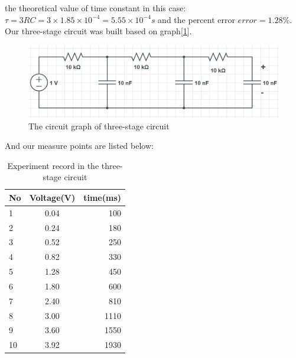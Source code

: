 the theoretical value of time constant in this case:\\
$\tau = 3RC = 3\times1.85\times10^{-4} = 5.55\times10^{-4}s$ and the percent error $error = 1.28\%$.\\
\phantom{ } Our three-stage circuit was built based on graph[\ref{fig:2.4}].\\
\begin{figure}[!htbp]
	\centering %
	\includegraphics[width=\linewidth]{images/2_4.PNG} %
	\caption{The circuit graph of three-stage circuit} %
	\label{fig:2.4} %
\end{figure}
\phantom{ }And our measure points are listed below:\\
\begin{table}[!htbp]\centering
	\caption{Experiment record in the three-stage circuit}
	\renewcommand\arraystretch{1.5}
	\begin{tabular}{lcr}
		\toprule
		No		&Voltage(V)	&time(ms)	\\
		\midrule
		1		&0.04		&100		\\
		
		2		&0.24		&180		\\
		
		3		&0.52		&250		\\
		
		4		&0.82		&330		\\
		
		5		&1.28		&450		\\
		
		6		&1.80		&600		\\
		
		7		&2.40		&810		\\
		
		8		&3.00		&1110		\\
		
		9		&3.60		&1550		\\
		
		10		&3.92		&1930		\\
		\bottomrule
	\end{tabular}
\end{table}
